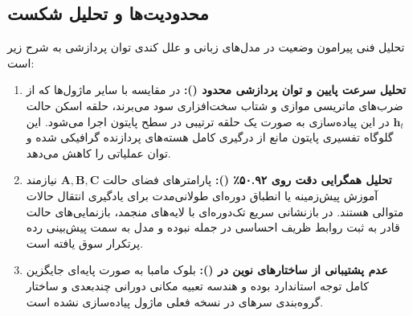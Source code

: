 \subsection{محدودیت‌ها و تحلیل شکست}
تحلیل فنی پیرامون وضعیت  در مدل‌های زبانی و علل کندی توان پردازشی به شرح زیر است:
\begin{enumerate}
    \item \textbf{تحلیل سرعت پایین و توان پردازشی محدود ():} در مقایسه با سایر ماژول‌ها که از ضرب‌های ماتریسی موازی و شتاب سخت‌افزاری  سود می‌برند، حلقه اسکن حالت $\mathbf{h}_t$ در این پیاده‌سازی به صورت یک حلقه ترتیبی در سطح پایتون اجرا می‌شود. این گلوگاه تفسیری پایتون مانع از درگیری کامل هسته‌های  پردازنده گرافیکی شده و توان عملیاتی را کاهش می‌دهد.
    \item \textbf{تحلیل همگرایی دقت روی ۵۰.۹۲٪ ():} پارامترهای فضای حالت $\mathbf{A}, \mathbf{B}, \mathbf{C}$ نیازمند آموزش پیش‌زمینه یا انطباق دوره‌ای طولانی‌مدت برای یادگیری انتقال حالات متوالی هستند. در بازنشانی سریع تک‌دوره‌ای با لایه‌های منجمد، بازنمایی‌های حالت قادر به ثبت روابط ظریف احساسی در جمله نبوده و مدل به سمت پیش‌بینی رده پرتکرار سوق یافته است.
    \item \textbf{عدم پشتیبانی از ساختارهای نوین در  ():} بلوک مامبا به صورت پایه‌ای جایگزین کامل توجه استاندارد بوده و هندسه تعبیه مکانی دورانی چندبعدی و ساختار گروه‌بندی سرهای  در نسخه فعلی ماژول پیاده‌سازی نشده است.
\end{enumerate}

